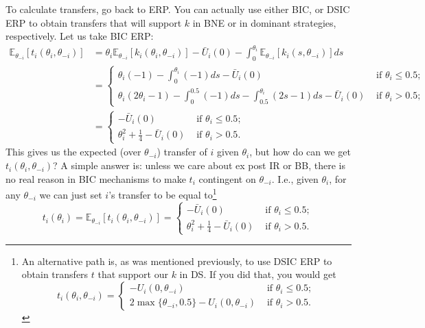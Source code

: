 \documentclass[a4paper]{article}
\begin{document}
	To calculate transfers, go back to ERP. You can actually use either BIC, or DSIC ERP to obtain transfers that will support $k$ in BNE or in dominant strategies, respectively. Let us take BIC ERP:
	\begin{align*}
		\mathbb{E}_{\theta_{-i}} [t_i(\theta_i,\theta_{-i})] 
		&= \theta_i \mathbb{E}_{\theta_{-i}} [k_i(\theta_i,\theta_{-i})] - \bar{U}_i(0) - \int_0^{\theta_i} \mathbb{E}_{\theta_{-i}} [k_i(s,\theta_{-i})] ds
		\\
		&= \begin{cases}
			\theta_i(-1) - \int_0^{\theta_i}(-1)ds - \bar{U}_i(0)	& \text{ if } \theta_i \leq 0.5;
			\\
			\theta_i (2\theta_i-1) - \int_0^{0.5}(-1)ds - \int_{0.5}^{\theta_i} (2s-1) ds - \bar{U}_i(0)	& \text{ if } \theta_i > 0.5;
		\end{cases}
		\\
		&= \begin{cases}
			- \bar{U}_i(0)	& \text{ if } \theta_i \leq 0.5;
			\\
			\theta_i^2 + \frac{1}{4} - \bar{U}_i(0)	& \text{ if } \theta_i > 0.5.
		\end{cases}
	\end{align*}
	This gives us the expected (over $\theta_{-i}$) transfer of $i$ given $\theta_i$, but how do can we get $t_i(\theta_i, \theta_{-i})$? A simple answer is: unless we care about ex post IR or BB, there is no real reason in BIC mechanisms to make $t_i$ contingent on $\theta_{-i}$. I.e., given $\theta_i$, for any $\theta_{-i}$ we can just set $i$'s transfer to be equal to\footnote{
		An alternative path is, as was mentioned previously, to use DSIC ERP to obtain transfers $t$ that support our $k$ in DS. If you did that, you would get
		$$t_i(\theta_i,\theta_{-i}) = 
		\begin{cases}
			- U_i(0,\theta_{-i})	& \text{ if } \theta_i \leq 0.5;
			\\
			2\max\{\theta_{-i}, 0.5\} - U_i(0,\theta_{-i})	& \text{ if } \theta_i > 0.5.
		\end{cases}$$
	} 
	$$t_i(\theta_i) = \mathbb{E}_{\theta_{-i}} [t_i(\theta_i,\theta_{-i})] = 
	\begin{cases}
		- \bar{U}_i(0)	& \text{ if } \theta_i \leq 0.5;
		\\
		\theta_i^2 + \frac{1}{4} - \bar{U}_i(0)	& \text{ if } \theta_i > 0.5.
	\end{cases}$$
	
\end{document}
